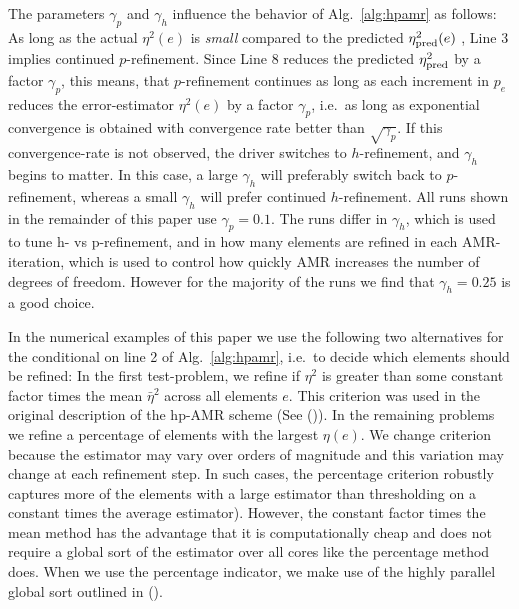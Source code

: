   The parameters $\gamma_p$ and $\gamma_h$
      influence the behavior of Alg.~\ref{alg:hpamr} as follows: As
      long as the actual $\eta^2(e)$ is \textit{small} compared to the
      predicted $\eta^2_{\rm pred}(e)$ , Line 3 implies continued
      $p$-refinement.  Since Line 8 reduces the predicted $\eta^2_{\rm
        pred}$ by a factor $\gamma_p$, this means, that $p$-refinement
      continues as long as each increment in $p_e$ reduces the
      error-estimator $\eta^2(e)$ by a factor $\gamma_p$, i.e.\ as
      long as exponential convergence is obtained with convergence
      rate better than $\sqrt{\gamma_p}$.  If this convergence-rate is
      not observed, the driver switches to $h$-refinement, and
      $\gamma_h$ begins to matter.  In this case, a large $\gamma_h$
      will preferably switch back to $p$-refinement, whereas a small
      $\gamma_h$ will prefer continued $h$-refinement.  All runs shown
      in the remainder of this paper use $\gamma_p=0.1$.  The runs
      differ in $\gamma_h$, which is used to tune h- vs p-refinement,
      and in how many elements are refined in each AMR-iteration,
      which is used to control how quickly AMR increases the number of
      degrees of freedom. However for the majority of the runs we find that $\gamma_h=0.25$ is a good choice.
  
In the numerical examples of this paper we use the
  following two alternatives for the conditional on line 2 of
  Alg.~\ref{alg:hpamr}, i.e.\ to decide which elements should be
  refined: In the first test-problem, we refine if $\eta^2$ is
greater than some constant factor times the mean $\bar \eta^2$ across all elements $e$. This criterion was used in the original description of the hp-AMR scheme (See (\cite{melenk2001residual})).  In
the remaining problems we refine a percentage of elements with the largest $\eta(e)$. We change criterion because the estimator may vary over orders of magnitude and this variation may change at each refinement step. In such cases, the percentage criterion robustly captures more of the elements with a large estimator than thresholding on a constant times the average estimator). However, the constant factor times the
mean method has the advantage that it is computationally cheap and
does not require a global sort of the estimator over all cores like the
percentage method does. When we use the percentage indicator, we make use of the highly parallel global sort outlined in (\cite{feng2015mp}).

